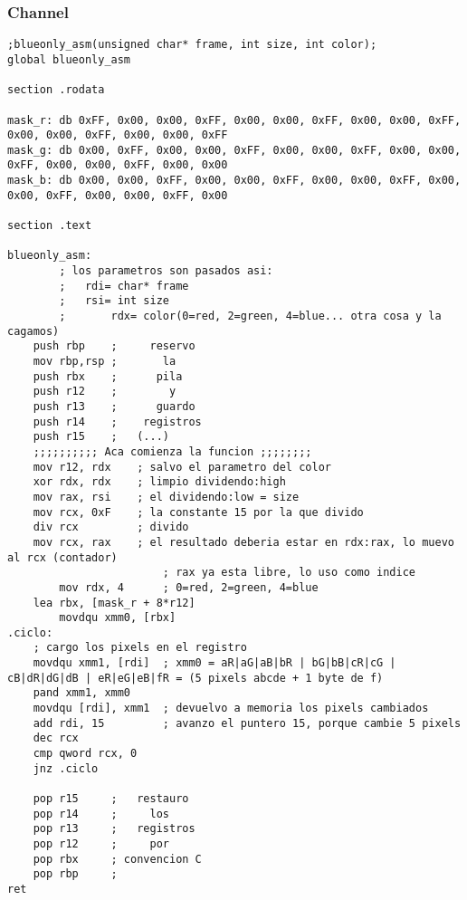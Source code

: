 \subsubsection{Channel}
\begin{verbatim}
;blueonly_asm(unsigned char* frame, int size, int color);
global blueonly_asm

section .rodata

mask_r: db 0xFF, 0x00, 0x00, 0xFF, 0x00, 0x00, 0xFF, 0x00, 0x00, 0xFF, 0x00, 0x00, 0xFF, 0x00, 0x00, 0xFF
mask_g: db 0x00, 0xFF, 0x00, 0x00, 0xFF, 0x00, 0x00, 0xFF, 0x00, 0x00, 0xFF, 0x00, 0x00, 0xFF, 0x00, 0x00
mask_b: db 0x00, 0x00, 0xFF, 0x00, 0x00, 0xFF, 0x00, 0x00, 0xFF, 0x00, 0x00, 0xFF, 0x00, 0x00, 0xFF, 0x00

section .text

blueonly_asm:
        ; los parametros son pasados asi:
        ;	rdi= char* frame
        ;	rsi= int size
        ;       rdx= color(0=red, 2=green, 4=blue... otra cosa y la cagamos)
	push rbp	;     reservo
	mov rbp,rsp	;       la
	push rbx	;      pila
	push r12	;        y
	push r13	;      guardo
	push r14	;    registros
	push r15	;   (...)
	;;;;;;;;;; Aca comienza la funcion ;;;;;;;;
	mov r12, rdx    ; salvo el parametro del color
	xor rdx, rdx	; limpio dividendo:high
	mov rax, rsi	; el dividendo:low = size
	mov rcx, 0xF	; la constante 15 por la que divido
	div rcx         ; divido
	mov rcx, rax	; el resultado deberia estar en rdx:rax, lo muevo al rcx (contador)
                        ; rax ya esta libre, lo uso como indice
        mov rdx, 4      ; 0=red, 2=green, 4=blue
	lea rbx, [mask_r + 8*r12]
        movdqu xmm0, [rbx]
.ciclo:
	; cargo los pixels en el registro
	movdqu xmm1, [rdi]	; xmm0 = aR|aG|aB|bR | bG|bB|cR|cG | cB|dR|dG|dB | eR|eG|eB|fR = (5 pixels abcde + 1 byte de f)
	pand xmm1, xmm0
    movdqu [rdi], xmm1  ; devuelvo a memoria los pixels cambiados
	add rdi, 15         ; avanzo el puntero 15, porque cambie 5 pixels
	dec rcx
	cmp qword rcx, 0
    jnz .ciclo

	pop r15		;   restauro
	pop r14		;     los
	pop r13		;   registros
	pop r12		;     por
	pop rbx		; convencion C
	pop rbp		;
ret

\end{verbatim}
